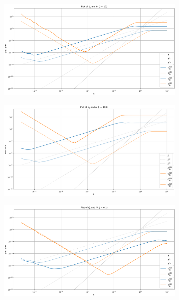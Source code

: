 \begin{figure}[h!]
    \centering
    \begin{subfigure}[b]{0.49\linewidth}
        \includegraphics[width=\linewidth]{graphics/j_error_plot/big_j.png}
    \end{subfigure}
    \begin{subfigure}[b]{0.49\linewidth}
        \includegraphics[width=\linewidth]{graphics/j_error_plot/large_j.png}
    \end{subfigure}
    \begin{subfigure}[b]{0.49\linewidth}
        \includegraphics[width=\linewidth]{graphics/j_error_plot/small_j.png}

\end{subfigure}
\end{figure}
